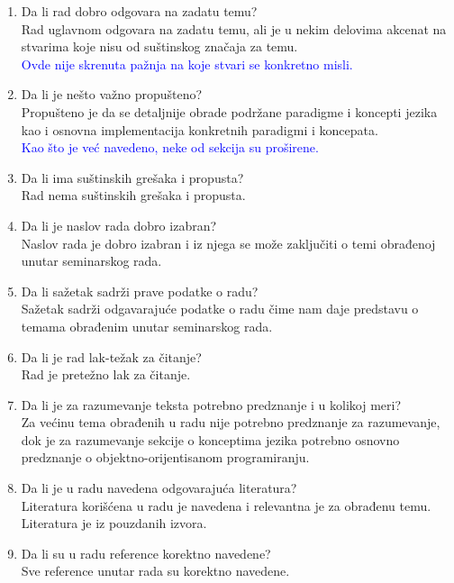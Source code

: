 \documentclass[a4paper]{report}
\newcommand{\odgovor}[1]{\textcolor{blue}{#1}}
\begin{document}
\begin{enumerate}
\item Da li rad dobro odgovara na zadatu temu?\\
Rad uglavnom odgovara na zadatu temu, ali je u nekim delovima akcenat na stvarima koje nisu od suštinskog značaja za temu. \\
\odgovor{Ovde nije skrenuta pažnja na koje stvari se konkretno misli.}

\item Da li je nešto važno propušteno?\\
Propušteno je da se detaljnije obrade podržane paradigme i koncepti jezika kao i osnovna implementacija konkretnih paradigmi i koncepata. \\
\odgovor{Kao što je već navedeno, neke od sekcija su proširene.}

\item Da li ima suštinskih grešaka i propusta?\\
Rad nema suštinskih grešaka i propusta.

\item Da li je naslov rada dobro izabran?\\
Naslov rada je  dobro izabran i iz njega se može zaključiti o temi obrađenoj unutar seminarskog rada.

\item Da li sažetak sadrži prave podatke o radu?\\
Sažetak sadrži odgavarajuće podatke o radu čime nam daje predstavu o temama obrađenim unutar seminarskog rada.

\item Da li je rad lak-težak za čitanje?\\
Rad je pretežno lak za čitanje.

\item Da li je za razumevanje teksta potrebno predznanje i u kolikoj meri?\\
Za većinu tema obrađenih u radu nije potrebno predznanje za razumevanje, dok je za razumevanje sekcije o konceptima jezika potrebno osnovno predznanje o objektno-orijentisanom programiranju.
 
\item Da li je u radu navedena odgovarajuća literatura?\\
Literatura korišćena u radu je navedena i relevantna je za obrađenu temu. Literatura je iz pouzdanih izvora.

\item Da li su u radu reference korektno navedene?\\
Sve reference unutar rada su korektno navedene.


\end{enumerate}
\end{document}
